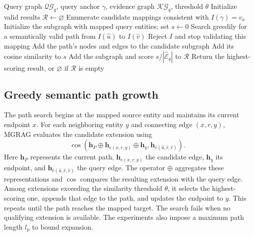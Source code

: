\begin{algorithm}[tbp]
\caption{Path-based semantic matching in MGRAG}
\label{alg:mgrag:matching}
\begin{algorithmic}[1]
\REQUIRE Query graph $\mathcal{QG}_q$, query anchor $\gamma$, evidence graph $\mathcal{KG}_q$, threshold $\theta$
\STATE Initialize valid results $\mathcal R\gets\varnothing$
\STATE Enumerate candidate mappings consistent with $I(\gamma)=v_a$
\STATE Initialize the subgraph with mapped query entities; set $s\gets0$
\STATE Search greedily for a semantically valid path from $I(\widehat u)$ to $I(\widehat v)$
\STATE Reject $I$ and stop validating this mapping
\ELSE
\STATE Add the path's nodes and edges to the candidate subgraph
\STATE Add its cosine similarity to $s$
\ENDIF
\ENDFOR
{}
\STATE Add the subgraph and score $s/|\widehat{\mathcal E}_q|$ to $\mathcal R$
\ENDIF
\ENDFOR
\ENDFOR
\STATE Return the highest-scoring result, or $\varnothing$ if $\mathcal R$ is empty
\end{algorithmic}
\end{algorithm}

\subsection{Greedy semantic path growth}

The path search begins at the mapped source entity and maintains its current endpoint $x$. For each neighboring entity $y$ and connecting edge $(x,r,y)$, MGRAG evaluates the candidate extension using
\begin{equation}
 \cos\!\left(\mathbf h_P\oplus\mathbf h_{e(x,r,y)}\oplus\mathbf h_y,
 \mathbf h_{\widehat e(\widehat u,\widehat r,\widehat v)}\right).
\label{eq:mgrag:greedy-score}
\end{equation}
Here $\mathbf h_P$ represents the current path, $\mathbf h_{e(x,r,y)}$ the candidate edge, $\mathbf h_y$ its endpoint, and $\mathbf h_{\widehat e(\widehat u,\widehat r,\widehat v)}$ the query edge. The operator $\oplus$ aggregates these representations and $\cos$ compares the resulting extension with the query edge. Among extensions exceeding the similarity threshold $\theta$, it selects the highest-scoring one, appends that edge to the path, and updates the endpoint to $y$. This repeats until the path reaches the mapped target. The search fails when no qualifying extension is available. The experiments also impose a maximum path length $l_p$ to bound expansion.

